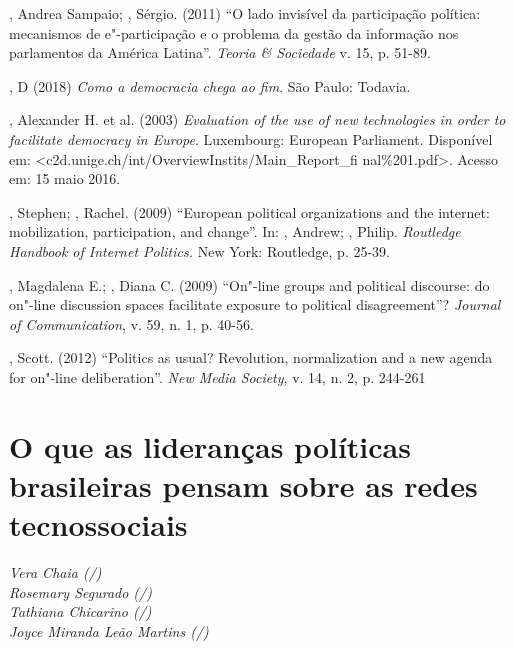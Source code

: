 \begin{Parskip}
, Andrea Sampaio; , Sérgio. (2011) ``O lado invisível da
participação política: mecanismos de e"-participação e o problema da
gestão da informação nos parlamentos da América Latina''. \emph{Teoria
\& Sociedade} v. 15, p. 51-89.

, D (2018) \emph{Como a democracia chega ao fim}. São Paulo:
Todavia.

, Alexander H. et al. (2003) \emph{Evaluation of the use of new
technologies in order to facilitate democracy in Europe}. Luxembourg:
European Parliament. Disponível em:
\textless{}c2d.unige.ch/int/OverviewInstits/Main\_Report\_fi
nal\%201.pdf\textgreater{}. Acesso em: 15 maio 2016.

, Stephen; , Rachel. (2009) ``European political organizations
and the internet: mobilization, participation, and change''. In:
, Andrew; , Philip. \emph{Routledge Handbook of Internet
Politics.} New York: Routledge, p. 25-39.

, Magdalena E.; , Diana C. (2009) ``On"-line groups and
political discourse: do on"-line discussion spaces facilitate exposure to
political disagreement''? \emph{Journal of Communication}, v. 59, n. 1,
p. 40-56.

, Scott. (2012) ``Politics as usual? Revolution, normalization and
a new agenda for on"-line deliberation''. \emph{New Media Society}, v.
14, n. 2, p. 244-261

\chapter*{O que as lideranças políticas brasileiras pensam sobre as redes
tecnossociais}
\end{Parskip}

\begin{flushright}
\emph{Vera Chaia (/)\\Rosemary Segurado (/)\\Tathiana
Chicarino (/)\\Joyce Miranda Leão Martins (/)}
\end{flushright}


